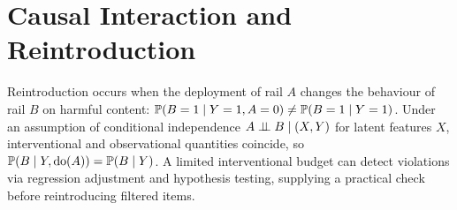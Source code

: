 \section{Causal Interaction and Reintroduction}
Reintroduction occurs when the deployment of rail $A$ changes the behaviour of rail $B$ on harmful
content: $\mathbb{P}(B=1\mid Y=1,A=0) \neq \mathbb{P}(B=1\mid Y=1)$. Under an assumption of conditional
independence $A \mathrel{\perp\!\!\!\perp} B \mid (X,Y)$ for latent features $X$, interventional and observational
quantities coincide, so $\mathbb{P}(B\mid Y,\mathrm{do}(A)) = \mathbb{P}(B\mid Y)$. A limited interventional budget
can detect violations via regression adjustment and hypothesis testing, supplying a practical check
before reintroducing filtered items.
